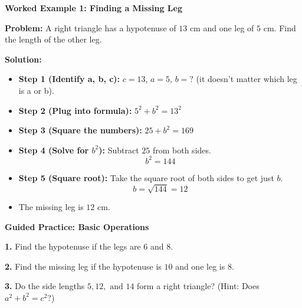 \documentclass[12pt, letterpaper, fleqn]{article}
\begin{document}
\vspace{3mm}

\begin{tcolorbox}[colback=white, colframe=black!25, boxrule=0.6pt, arc=4mm, left=6mm, right=6mm, top=5mm, bottom=5mm]

\textbf{Worked Example 1: Finding a Missing Leg}

\medskip

\textbf{Problem:} A right triangle has a hypotenuse of $13\text{ cm}$ and one leg of $5\text{ cm}$. Find the length of the other leg.

\medskip

\textbf{Solution:}
\begin{itemize}
    \item \textbf{Step 1 (Identify a, b, c):} $c = 13$, $a = 5$, $b = ?$ (it doesn't matter which leg is a or b).
    \item \textbf{Step 2 (Plug into formula):} $5^2 + b^2 = 13^2$
    \item \textbf{Step 3 (Square the numbers):} $25 + b^2 = 169$
    \item \textbf{Step 4 (Solve for $b^2$):} Subtract $25$ from both sides.
    \[ b^2 = 144 \]
    \item \textbf{Step 5 (Square root):} Take the square root of both sides to get just $b$.
    \[ b = \sqrt{144} = 12 \]
    \item The missing leg is $12\text{ cm}$.
\end{itemize}

\end{tcolorbox}

\vspace{4mm}

\begin{tcolorbox}[colback=white!15, colframe=black, boxrule=1.5pt, arc=4mm, left=6mm, right=6mm, top=5mm, bottom=5mm]

\textbf{Guided Practice: Basic Operations}

\medskip

\noindent
\textbf{1.} Find the hypotenuse if the legs are $6$ and $8$.
\vspace{2cm}

\noindent
\textbf{2.} Find the missing leg if the hypotenuse is $10$ and one leg is $8$.
\vspace{2cm}

\noindent
\textbf{3.} Do the side lengths $5, 12, \text{ and } 14$ form a right triangle? (Hint: Does $a^2 + b^2 = c^2$?)
\vspace{2cm}

\end{tcolorbox}
\end{document}
